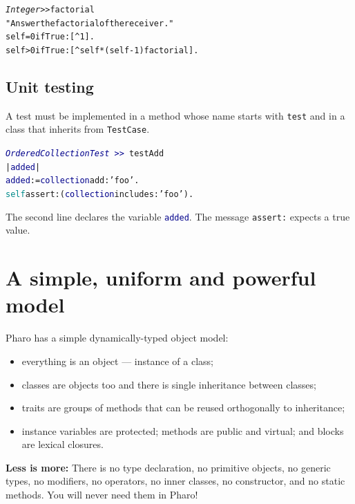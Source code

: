 \documentclass[notumble]{leaflet}
\makeatletter
\newenvironment{displaycode}{%
     \par
     \hspace{1.5em}\begin{minipage}{\linewidth}
       \begin{alltt}\small}{
       \end{alltt}
     \end{minipage}
     \par}
\newcommand{\code}[1]{\foreignlanguage{english}{\texttt{#1}}}
\makeatother
\begin{document}
\begin{displaycode}
\textit{Integer >>} factorial
   "Answer the factorial of the receiver."
   self = 0 ifTrue: [^ 1].
   self > 0 ifTrue: [^ self * (self - 1) factorial].
\end{displaycode}




\subsection{Unit testing}
A test must be implemented in a method whose name starts with \code{test} and in a class that
inherits from \code{TestCase}.

\begin{displaycode}
\textcolor{darkBlue}{\textit{OrderedCollectionTest}\,>>}\,testAdd
  | \textcolor{darkBlue}{added} |
  \textcolor{darkBlue}{added} := \textcolor{darkBlue}{collection} add: \textcolor{string}{'foo'}.
  \textcolor{darkCyan}{self} assert: (\textcolor{darkBlue}{collection} includes: \textcolor{string}{'foo'}).
\end{displaycode}

The second line declares the variable \code{\textcolor{darkBlue}{added}}. The message \code{assert:} expects a true value.

\section{A simple, uniform and powerful model}

Pharo has a simple dynamically-typed object model:
\begin{itemize}
\item everything is an object --- instance of a class;
\item classes are objects too and there is single inheritance between classes;
\item traits are groups of methods that can be reused orthogonally to inheritance;
\item instance variables are protected; methods are public and virtual;
and blocks are lexical closures.
\end{itemize}

\textbf{Less is more:} There is no type declaration, no primitive
objects, no generic types, no modifiers, no operators, no inner
classes, no constructor, and no static methods. You will never need them in
Pharo!



\end{document}
